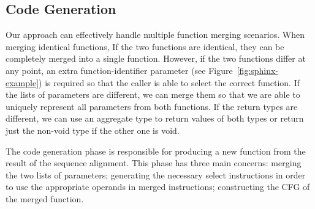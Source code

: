 

\subsection{Code Generation}
Our approach can effectively handle multiple function merging scenarios.
When merging identical functions, 
If the two functions are identical, they can be completely merged into a single function.
However, if the two functions differ at any point, an extra function-identifier parameter (see Figure~\ref{fig:sphinx-example}) is required so that the caller is able to select the correct function.
If the lists of parameters are different, we can merge them so that we are able to uniquely represent all parameters from both functions. If the return types are different, we can use an aggregate type to return
values of both types or return just the non-void type if the other one is void.

The code generation phase is responsible for producing a new function from the result of the sequence alignment. This phase has three main concerns: merging the two lists of parameters;
generating the necessary select instructions in order to
use the appropriate operands in merged instructions;
constructing the CFG of the merged function.



